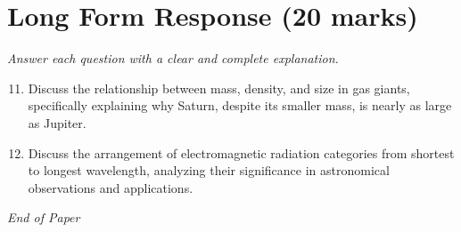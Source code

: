 \documentclass[12pt]{article}
\begin{document}
\section*{Long Form Response (20 marks)}
\textit{Answer each question with a clear and complete explanation.}
\begin{enumerate}[label=\arabic*.]
\setcounter{enumi}{10}
\item Discuss the relationship between mass, density, and size in gas giants, specifically explaining why Saturn, despite its smaller mass, is nearly as large as Jupiter.
\item Discuss the arrangement of electromagnetic radiation categories from shortest to longest wavelength, analyzing their significance in astronomical observations and applications.
\end{enumerate}

\vfill
\noindent\textit{End of Paper}
\end{document}
